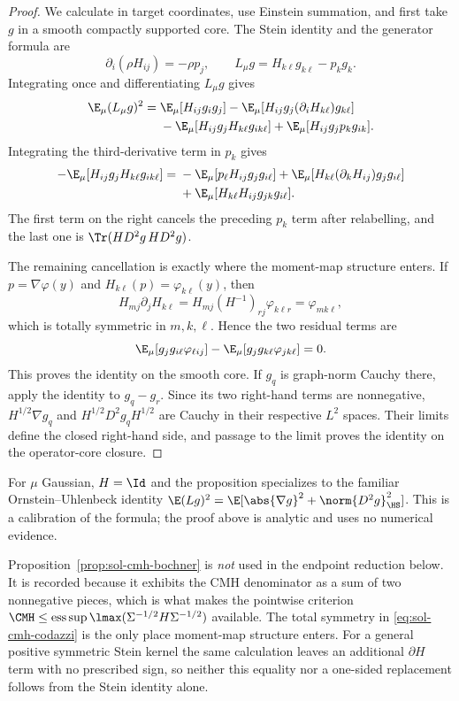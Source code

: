 \documentclass[../main.tex]{subfiles}
\begin{document}
\begin{proof}
We calculate in target coordinates, use Einstein summation, and first take $g$ in a smooth
compactly supported core.  The Stein identity and the generator formula are
\[
  \partial_i(\rho H_{ij})=-\rho p_j,
  \qquad L_\mu g=H_{k\ell}g_{k\ell}-p_k g_k.
\]
Integrating once and differentiating $L_\mu g$ gives
\begin{align*}
  \E_\mu(L_\mu g)^2
  ={}&\E_\mu[H_{ij}g_i g_j]
     -\E_\mu[H_{ij}g_j(\partial_iH_{k\ell})g_{k\ell}]\\
    &-\E_\mu[H_{ij}g_jH_{k\ell}g_{ik\ell}]
     +\E_\mu[H_{ij}g_jp_k g_{ik}].
\end{align*}
Integrating the third-derivative term in $p_k$ gives
\begin{align*}
 -\E_\mu[H_{ij}g_jH_{k\ell}g_{ik\ell}]
  ={}&-\E_\mu[p_\ell H_{ij}g_jg_{i\ell}]
      +\E_\mu[H_{k\ell}(\partial_kH_{ij})g_jg_{i\ell}]\\
     &+\E_\mu[H_{k\ell}H_{ij}g_{jk}g_{i\ell}].
\end{align*}
The first term on the right cancels the preceding $p_k$ term after relabelling, and the last
one is $\Tr(HD^2g\,HD^2g)$.

The remaining cancellation is exactly where the moment-map structure enters.  If
$p=\nabla\varphi(y)$ and $H_{k\ell}(p)=\varphi_{k\ell}(y)$, then
\begin{equation}
  H_{mj}\partial_jH_{k\ell}
  =H_{mj}(H^{-1})_{rj}\varphi_{k\ell r}
  =\varphi_{mk\ell},
  \label{eq:sol-cmh-codazzi}
\end{equation}
which is totally symmetric in $m,k,\ell$.  Hence the two residual terms are
\[
  \E_\mu[g_jg_{i\ell}\varphi_{\ell ij}]
  -\E_\mu[g_jg_{k\ell}\varphi_{jk\ell}]=0.
\]
This proves the identity on the smooth core.  If $g_q$ is graph-norm Cauchy there, apply the
identity to $g_q-g_r$.  Since its two right-hand terms are nonnegative,
$H^{1/2}\nabla g_q$ and $H^{1/2}D^2g_qH^{1/2}$ are Cauchy in their respective $L^2$ spaces.
Their limits define the closed right-hand side, and passage to the limit proves the identity on
the operator-core closure.
\end{proof}

For $\mu$ Gaussian, $H=\Id$ and the proposition specializes to the familiar
Ornstein--Uhlenbeck identity
$\E(Lg)^2=\E[\abs{\nabla g}^2+\norm{D^2g}_{\HS}^2]$.  This is a calibration of the formula; the
proof above is analytic and uses no numerical evidence.

\begin{remark}
Proposition~\ref{prop:sol-cmh-bochner} is \emph{not} used in the endpoint reduction below. It is
recorded because it exhibits the CMH denominator as a sum of two nonnegative pieces, which is
what makes the pointwise criterion
$\CMH\le\operatorname*{ess\,sup}\lmax(\Sigma^{-1/2}H\Sigma^{-1/2})$ available.  The total
symmetry in \eqref{eq:sol-cmh-codazzi} is the only place moment-map structure enters.  For a
general positive symmetric Stein kernel the same calculation leaves an additional
$\partial H$ term with no prescribed sign, so neither this equality nor a one-sided replacement
follows from the Stein identity alone.
\end{remark}
\end{document}
